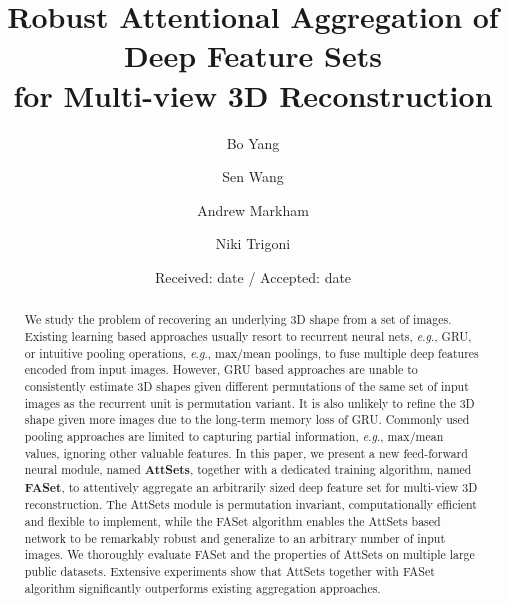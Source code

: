 \documentclass[twocolumn]{svjour3}    \pdfoutput=1
\newcommand{\nickname}{AttSets}
\newcommand{\faset}{FASet}
\newcommand{\eg}{\textit{e}.\textit{g}., }
\begin{document}
\title{Robust Attentional Aggregation of Deep Feature Sets \\ for Multi-view 3D Reconstruction}

\author{Bo Yang  \and Sen Wang \and Andrew Markham \and Niki Trigoni }

\date{Received: date / Accepted: date}


\maketitle

\begin{abstract}
We study the problem of recovering an underlying 3D shape from a set of images. Existing learning based approaches usually resort to recurrent neural nets, \eg GRU, or intuitive pooling operations, \eg max/mean poolings, to fuse multiple deep features encoded from input images. However, GRU based approaches are unable to consistently estimate 3D shapes given different permutations of the same set of input images as the recurrent unit is permutation variant. It is also unlikely to refine the 3D shape given more images due to the long-term memory loss of GRU. Commonly used pooling approaches are limited to capturing partial information, \eg max/mean values, ignoring other valuable features. In this paper, we present a new feed-forward neural module, named \textbf{AttSets}, together with a dedicated training algorithm, named \textbf{FASet}, to attentively aggregate an arbitrarily sized deep feature set for multi-view 3D reconstruction. The \nickname{} module is permutation invariant, computationally efficient and flexible to implement, while the \faset{} algorithm enables the \nickname{} based network to be remarkably robust and generalize to an arbitrary number of input images. We thoroughly evaluate \faset{} and the properties of \nickname{} on multiple large public datasets. Extensive experiments show that \nickname{} together with \faset{} algorithm significantly outperforms existing aggregation approaches.

\end{abstract}
\end{document}
